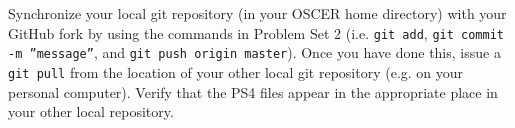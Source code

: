 \documentclass[12pt,english]{exam}
\begin{document}
\begin{questions}
\question Synchronize your local git repository (in your OSCER home directory) with your GitHub fork by using the commands in Problem Set 2 (i.e. \texttt{git add}, \texttt{git commit -m ''message''}, and \texttt{git push origin master}). Once you have done this, issue a \texttt{git pull} from the location of your other local git repository (e.g. on your personal computer). Verify that the PS4 files appear in the appropriate place in your other local repository.

\end{questions}
\end{document}
